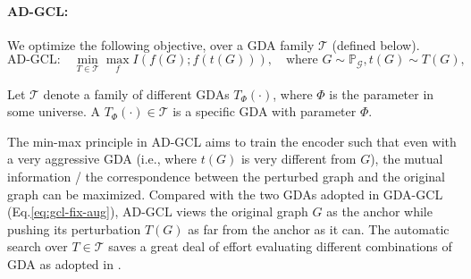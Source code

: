 \paragraph{AD-GCL:} %
We optimize the following objective, over a GDA family $\mathcal{T}$ (defined below).
\begin{equation} \label{eq:ad-gcl}
  \text{AD-GCL:}\quad  \min_{T\in \mathcal{T}} \max_{f} I(f(G) ; f(t(G))), \quad \text{where } G\sim \mathbb{P}_{\mathcal{G}}, t(G)\sim T(G),
\end{equation}
\begin{definition}  Let $\mathcal{T}$ denote a family of different GDAs $T_{\Phi}(\cdot)$, where $\Phi$ is the parameter in some universe. A $T_{\Phi}(\cdot)\in \mathcal{T}$ is a specific GDA with parameter $\Phi$. 
\end{definition} \vspace{-0.5mm}
The min-max principle in AD-GCL aims to train the encoder such that even with a very aggressive GDA (i.e., where $t(G)$ is very different from $G$), the mutual information / the correspondence between the perturbed graph and the original graph can be maximized. %
Compared with the two GDAs adopted in GDA-GCL (Eq.\ref{eq:gcl-fix-aug}), AD-GCL views the original graph $G$ as the anchor while pushing its perturbation $T(G)$ as far from the anchor as it can. The automatic search over $T \in \mathcal{T}$ saves a great deal of effort  evaluating different combinations of GDA as adopted in \cite{you2020graph}. %

\vspace{-2mm}
